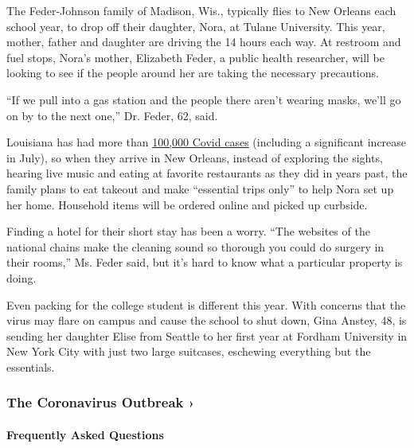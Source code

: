 The Feder-Johnson family of Madison, Wis., typically flies to New
Orleans each school year, to drop off their daughter, Nora, at Tulane
University. This year, mother, father and daughter are driving the 14
hours each way. At restroom and fuel stops, Nora's mother, Elizabeth
Feder, a public health researcher, will be looking to see if the people
around her are taking the necessary precautions.

``If we pull into a gas station and the people there aren't wearing
masks, we'll go on by to the next one,'' Dr. Feder, 62, said.

Louisiana has had more than
\href{https://eur01.safelinks.protection.outlook.com/?url=https\%3A\%2F\%2Fwww.nytimes.com\%2Finteractive\%2F2020\%2Fus\%2Flouisiana-coronavirus-cases.html\&data=02\%7C01\%7C\%7Cf98faf91db4c457cd27e08d82cdc651d\%7C84df9e7fe9f640afb435aaaaaaaaaaaa\%7C1\%7C0\%7C637308672381698693\&sdata=VRikgzNv7F\%2B0pyPzti\%2FBaZGxDJK0RPTBOb7Ya7c7ssM\%3D\&reserved=0}{100,000
Covid cases} (including a significant increase in July), so when they
arrive in New Orleans, instead of exploring the sights, hearing live
music and eating at favorite restaurants as they did in years past, the
family plans to eat takeout and make ``essential trips only'' to help
Nora set up her home. Household items will be ordered online and picked
up curbside.

Finding a hotel for their short stay has been a worry. ``The websites of
the national chains make the cleaning sound so thorough you could do
surgery in their rooms,'' Ms. Feder said, but it's hard to know what a
particular property is doing.

Even packing for the college student is different this year. With
concerns that the virus may flare on campus and cause the school to shut
down, Gina Anstey, 48, is sending her daughter Elise from Seattle to her
first year at Fordham University in New York City with just two large
suitcases, eschewing everything but the essentials.

\href{https://www.nytimes.com/news-event/coronavirus?action=click\&pgtype=Article\&state=default\&region=MAIN_CONTENT_3\&context=storylines_faq}{}

\hypertarget{the-coronavirus-outbreak-}{%
\subsubsection{The Coronavirus Outbreak
›}\label{the-coronavirus-outbreak-}}

\hypertarget{frequently-asked-questions}{%
\paragraph{Frequently Asked
Questions}\label{frequently-asked-questions}}

